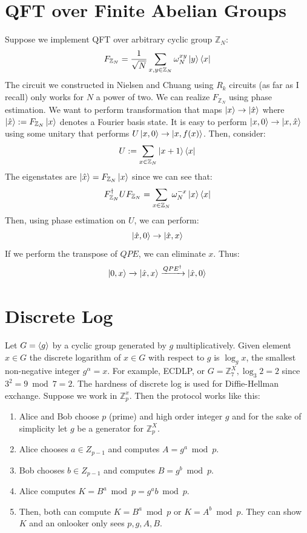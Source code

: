 \documentclass{article}
\begin{document}
\section{QFT over Finite Abelian Groups}
Suppose we implement QFT over arbitrary cyclic group $\mathbb{Z}_N$:
$$F_{\mathbb{Z}_N} = \frac{1}{\sqrt{N}} \sum_{x,y \in \mathbb{Z}_N} \omega^{xy}_N \ket{y}\bra{x}$$
The circuit we constructed in Nielsen and Chuang using $R_{k}$ circuits (as far as I recall) only works for $N$ a power of two. We can realize $F_{\mathbb{Z}_{N}}$ using phase estimation. We want to perform transformation that maps $\ket{x} \to \ket{\hat{x}}$ where $\ket{\hat{x}} := F_{\mathbb{Z}_N} \ket{x}$ denotes a Fourier basis state. It is easy to perform $\ket{x,0} \to \ket{x, \hat{x}}$ using some unitary that performs $U\ket{x, 0} \to \ket{x, f(x)}$. Then, consider:
$$ U := \sum_{x \in \mathbb{Z}_N} \ket{x+1}\bra{x}$$
The eigenstates are $\ket{\hat{x}} = F_{\mathbb{Z}_N} \ket{x}$ since we can see that:
$$F^{\dag}_{\mathbb{Z}_N} U F_{\mathbb{Z}_N} = \sum_{x \in \mathbb{Z}_N} \omega_N^{-x} \ket{x}\bra{x}$$
Then, using phase estimation on $U$, we can perform:
$$\ket{\hat{x},0}\to\ket{\hat{x},x}$$
If we perform the transpose of $QPE$, we can eliminate $x$. Thus:
$$\ket{0,x} \xrightarrow[]{} \ket{\hat{x}, x} \xrightarrow[]{QPE^\dag} \ket{\hat{x}, 0}$$
\section{Discrete Log}
Let $G = \braket{g}$ by a cyclic group generated by $g$ multiplicatively. Given element $x \in G$ the discrete logarithm of $x \in G$ with respect to $g$ is $\log_g x$, the smallest non-negative integer $g^\alpha = x$. For example, ECDLP, or $G = \mathbb{Z}_7^X, \log_3 2 = 2$ since $3^2 = 9 \bmod 7 = 2$.
The hardness of discrete log is used for Diffie-Hellman exchange. Suppose we work in $\mathbb{Z}_p^x$. Then the protocol works like this:
\begin{enumerate}
	\item Alice and Bob choose $p$ (prime) and high order integer $g$ and for the sake of simplicity let $g$ be a generator for $\mathbb{Z}_p^X$.
	\item Alice chooses $a \in Z_{p-1}$ and computes $A = g^a \bmod p$.
	\item Bob chooses $b \in Z_{p-1}$ and computes $B=g^b \bmod p$.
	\item Alice computes $K = B^a \bmod p = g^ab \bmod p$.
	\item Then, both can compute $K = B^a \bmod p$ or $K = A^b \bmod p$.
	They can show $K$ and an onlooker only sees $p,g, A, B$.
\end{enumerate}
\end{document}
